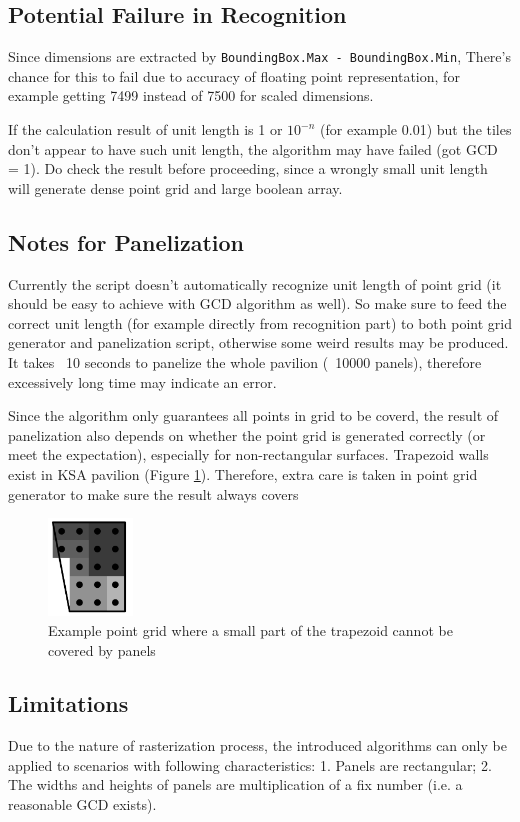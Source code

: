 \documentclass{article}
\begin{document}
\subsection{Potential Failure in Recognition}

Since dimensions are extracted by \lstinline{BoundingBox.Max - BoundingBox.Min}, There's chance for this to fail due to accuracy of floating point representation, for example getting 7499 instead of 7500 for scaled dimensions.

If the calculation result of unit length is 1 or $10^{-n}$ (for example 0.01) but the tiles don't appear to have such unit length, the algorithm may have failed (got GCD = 1). Do check the result before proceeding, since a wrongly small unit length will generate dense point grid and large boolean array.

\subsection{Notes for Panelization}

Currently the script doesn't automatically recognize unit length of point grid (it should be easy to achieve with GCD algorithm as well). So make sure to feed the correct unit length (for example directly from recognition part) to both point grid generator and panelization script, otherwise some weird results may be produced. It takes ~10 seconds to panelize the whole pavilion (~10000 panels), therefore excessively long time may indicate an error.

Since the algorithm only guarantees all points in grid to be coverd, the result of panelization also depends on whether the point grid is generated correctly (or meet the expectation), especially for non-rectangular surfaces. Trapezoid walls exist in KSA pavilion (Figure \ref{trapeziod}). Therefore, extra care is taken in point grid generator to make sure the result always covers 

\begin{figure}[hbt!]
	\centering
	\includegraphics[width=0.2\textwidth]{Figures/BadGrid.png}
	\caption{Example point grid where a small part of the trapezoid cannot be covered by panels}
	\label{trapeziod}
\end{figure}

\FloatBarrier

\subsection{Limitations}

Due to the nature of rasterization process, the introduced algorithms can only be applied to scenarios with following characteristics: 1. Panels are rectangular; 2. The widths and heights of panels are multiplication of a fix number (i.e. a reasonable GCD exists).
\end{document}
